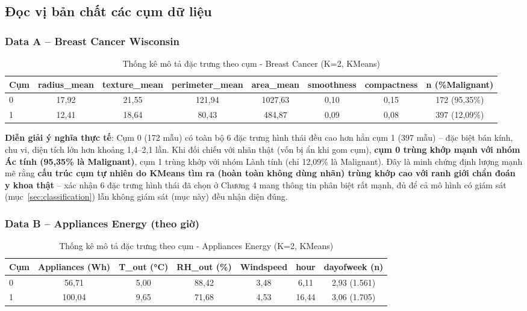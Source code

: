 \subsection{Đọc vị bản chất các cụm dữ liệu}

\subsubsection{Data A -- Breast Cancer Wisconsin}

\begin{table}[H]
\centering
\caption{Thống kê mô tả đặc trưng theo cụm - Breast Cancer (K=2, KMeans)}
\label{tab:cluster-profile-bc}
\label{tab:chapter4_clustering_profiles}
\begin{tabular}{lccccccc}
\toprule
\textbf{Cụm} & radius\_mean & texture\_mean & perimeter\_mean & area\_mean & smoothness & compactness & n (\%Malignant) \\
\midrule
0 & 17,92 & 21,55 & 121,94 & 1027,63 & 0,10 & 0,15 & 172 (95,35\%) \\
1 & 12,41 & 18,64 & 80,43 & 484,87 & 0,09 & 0,08 & 397 (12,09\%) \\
\bottomrule
\end{tabular}
\end{table}

\textbf{Diễn giải ý nghĩa thực tế}: Cụm 0 (172 mẫu) có toàn bộ 6 đặc trưng hình thái đều cao hơn hẳn cụm 1 (397 mẫu) -- đặc biệt bán kính, chu vi, diện tích lớn hơn khoảng 1,4--2,1 lần. Khi đối chiếu với nhãn thật (vốn bị ẩn khi gom cụm), \textbf{cụm 0 trùng khớp mạnh với nhóm Ác tính (95,35\% là Malignant)}, cụm 1 trùng khớp với nhóm Lành tính (chỉ 12,09\% là Malignant). Đây là minh chứng định lượng mạnh mẽ rằng \textbf{cấu trúc cụm tự nhiên do KMeans tìm ra (hoàn toàn không dùng nhãn) trùng khớp cao với ranh giới chẩn đoán y khoa thật} -- xác nhận 6 đặc trưng hình thái đã chọn ở Chương 4 mang thông tin phân biệt rất mạnh, đủ để cả mô hình có giám sát (mục~\ref{sec:classification}) lẫn không giám sát (mục này) đều nhận diện đúng.

\subsubsection{Data B -- Appliances Energy (theo giờ)}

\begin{table}[H]
\centering
\caption{Thống kê mô tả đặc trưng theo cụm - Appliances Energy (K=2, KMeans)}
\label{tab:cluster-profile-energy}
\begin{tabular}{lcccccc}
\toprule
\textbf{Cụm} & Appliances (Wh) & T\_out (°C) & RH\_out (\%) & Windspeed & hour & dayofweek (n) \\
\midrule
0 & 56,71 & 5,00 & 88,42 & 3,48 & 6,11 & 2,93 (1.561) \\
1 & 100,04 & 9,65 & 71,68 & 4,53 & 16,44 & 3,06 (1.705) \\
\bottomrule
\end{tabular}
\end{table}

